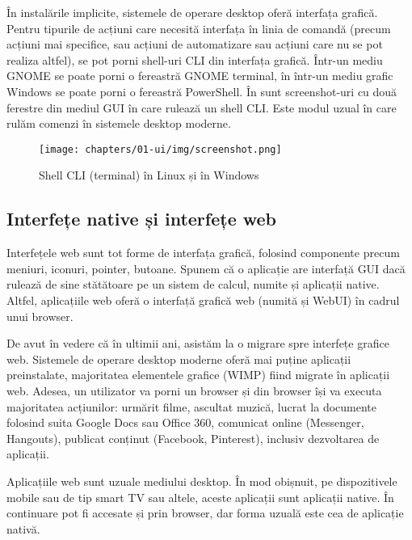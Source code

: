 În instalările implicite, sistemele de operare desktop oferă interfața grafică. Pentru tipurile de acțiuni care necesită interfața în linia de comandă (precum acțiuni mai specifice, sau acțiuni de automatizare sau acțiuni care nu se pot realiza altfel), se pot porni shell-uri CLI din interfața grafică. Într-un mediu GNOME se poate porni o fereastră GNOME terminal, în într-un mediu grafic Windows se poate porni o fereastră PowerShell. În  sunt screenshot-uri cu două ferestre din mediul GUI în care rulează un shell CLI. Este modul uzual în care rulăm comenzi în sistemele desktop moderne.

\begin{figure}[!htbp]
  \centering
  \texttt{[image: chapters/01-ui/img/screenshot.png]}
  \caption{Shell CLI (terminal) în Linux și în Windows}
  \label{fig:ui:shell-cli-linux-windows}
\end{figure}

\subsection{Interfețe native și interfețe web}
\label{sec:ui:native-web}

Interfețele web sunt tot forme de interfața grafică, folosind componente precum meniuri, iconuri, pointer, butoane. Spunem că o aplicație are interfață GUI dacă rulează de sine stătătoare pe un sistem de calcul, numite și aplicații native. Altfel, aplicațiile web oferă o interfață grafică web (numită și WebUI) în cadrul unui browser.

De avut în vedere că în ultimii ani, asistăm la o migrare spre interfețe grafice web. Sistemele de operare desktop moderne oferă mai puține aplicații preinstalate, majoritatea elementele grafice (WIMP) fiind migrate în aplicații web. Adesea, un utilizator va porni un browser și din browser își va executa majoritatea acțiunilor: urmărit filme, ascultat muzică, lucrat la documente folosind suita Google Docs sau Office 360, comunicat online (Messenger, Hangouts), publicat conținut (Facebook, Pinterest), inclusiv dezvoltarea de aplicații.

Aplicațiile web sunt uzuale mediului desktop. În mod obișnuit, pe dispozitivele mobile sau de tip smart TV sau altele, aceste aplicații sunt aplicații native. În continuare pot fi accesate și prin browser, dar forma uzuală este cea de aplicație nativă.


